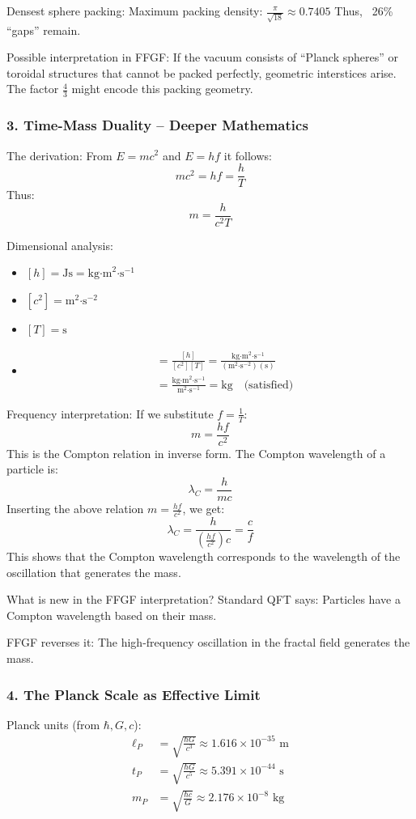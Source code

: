 	Densest sphere packing:
	Maximum packing density: \( \frac{\pi}{\sqrt{18}} \approx 0.7405 \)
	Thus, ~26\% ``gaps'' remain.
	
	Possible interpretation in FFGF:
	If the vacuum consists of ``Planck spheres'' or toroidal structures that cannot be packed perfectly, geometric interstices arise. The factor \( \frac{4}{3} \) might encode this packing geometry.
	
	\subsubsection{3. Time-Mass Duality – Deeper Mathematics}
	The derivation:
	From \( E = mc^2 \) and \( E = hf \) it follows:
	\[
	mc^2 = hf = \frac{h}{T}
	\]
	Thus:
	\[
	m = \frac{h}{c^2 T}
	\]
	
	Dimensional analysis:
	\begin{itemize}
		\item \( [h] = \text{Js} = \text{kg·m}^2\text{·s}^{-1} \)
		\item \( [c^2] = \text{m}^2\text{·s}^{-2} \)
		\item \( [T] = \text{s} \)
		\item \begin{align}
			[m] &= \frac{[h]}{[c^2][T]} = \frac{\text{kg·m}^2\text{·s}^{-1}}{(\text{m}^2\text{·s}^{-2})(\text{s})} \\
			&= \frac{\text{kg·m}^2\text{·s}^{-1}}{\text{m}^2\text{·s}^{-1}} = \text{kg} \quad \text{(satisfied)}
		\end{align}
	\end{itemize}
	
	Frequency interpretation:
	If we substitute \( f = \frac{1}{T} \):
	\[
	m = \frac{hf}{c^2}
	\]
	This is the Compton relation in inverse form. The Compton wavelength of a particle is:
	\[
	\lambda_C = \frac{h}{mc}
	\]
	Inserting the above relation \( m = \frac{hf}{c^2} \), we get:
	\[
	\lambda_C = \frac{h}{\left(\frac{hf}{c^2}\right)c} = \frac{c}{f}
	\]
	This shows that the Compton wavelength corresponds to the wavelength of the oscillation that generates the mass.
	
	What is new in the FFGF interpretation?
	Standard QFT says: Particles have a Compton wavelength based on their mass.
	
	FFGF reverses it: The high-frequency oscillation in the fractal field generates the mass.
	
	\subsubsection{4. The Planck Scale as Effective Limit}
	Planck units (from \( \hbar, G, c \)):
	\begin{align}
		\ell_P &= \sqrt{\frac{\hbar G}{c^3}} \approx 1.616 \times 10^{-35} \text{ m} \\
		t_P &= \sqrt{\frac{\hbar G}{c^5}} \approx 5.391 \times 10^{-44} \text{ s} \\
		m_P &= \sqrt{\frac{\hbar c}{G}} \approx 2.176 \times 10^{-8} \text{ kg}
	\end{align}
	
